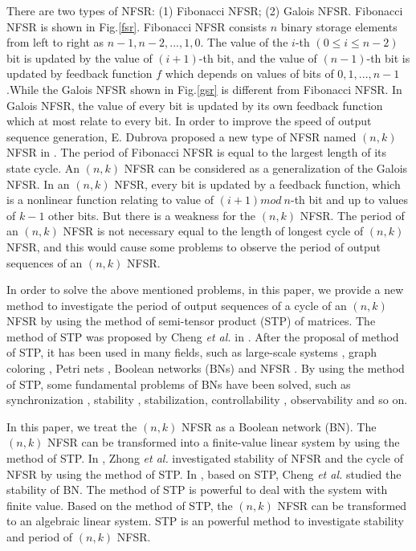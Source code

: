 \documentclass[conference]{IEEEtran}
\begin{document}
There are two types of NFSR: (1) Fibonacci NFSR; (2) Galois NFSR. Fibonacci NFSR is shown in Fig.\ref{fsr}. Fibonacci NFSR consists $n$ binary storage elements from left to right as $n-1,n-2,...,1,0$. The value of the $i$-th $(0\leq i\leq n-2)$ bit is updated by the value of $(i+1)$-th bit, and the value of $(n-1)$-th bit is updated by feedback function $f$ which depends on values of bits of $0,1,...,n-1$.While the Galois NFSR shown in Fig.\ref{gsr} is different from Fibonacci NFSR. In Galois NFSR, the value of every bit is updated by its own feedback function which at most relate to every bit. In order to improve the speed of output sequence generation, E. Dubrova proposed a new type of NFSR named $(n,k)$ NFSR in \cite{Dubrova2008On}. The period of Fibonacci NFSR is equal to the largest length of its state cycle. An $(n,k)$ NFSR can be considered as a generalization of the Galois NFSR. In an $(n,k)$ NFSR, every bit is updated by a feedback function, which is a nonlinear function relating to value of $(i+1)mod~n$-th bit and up to values of $k-1$ other bits. But there is a weakness for the $(n,k)$ NFSR. The period of an $(n,k)$ NFSR is not necessary equal to the length of longest cycle of $(n,k)$ NFSR, and this would cause some problems to observe the period of output sequences of an $(n,k)$ NFSR. 

In order to solve the above mentioned problems, in this paper, we provide a new method to investigate the period of output sequences of a cycle of an $(n,k)$ NFSR by using the method of semi-tensor product (STP) of matrices. The method of STP was proposed by Cheng \textit{et al.} in \cite{Cheng2011Analysis}. After the proposal of method of STP, it has been used in many fields, such as large-scale systems \cite{Zhao2013Aggregation}, graph coloring \cite{Wang2012A}\cite{Zhong2015Finding}, Petri nets \cite{Han2015Calculation}, Boolean networks (BNs) \cite{Guo2015Set}\cite{Fornasini2013On} and NFSR \cite{Zhong2014Stability}\cite{Zhao2014Novel}. By using the method of STP, some fundamental problems of BNs have been solved,
such as synchronization \cite{Zhong2014Synchronization}\cite{Zhang2014Synchronization}, stability \cite{Liu2016Sampled}\cite{Li2014Stability}\cite{Fornasini2013On}, stabilization\cite{Li2016Feedback}\cite{Bof2015Output}, controllability \cite{Lu2016On}\cite{Zhong2016Controllability}\cite{Liu2015Controllability}\cite{Li2016On}, observability \cite{Laschov2013Observability}\cite{Zhang2013Controllability} and so on.

In this paper, we treat the $(n,k)$ NFSR as a Boolean network (BN). The $(n,k)$ NFSR can be transformed into a finite-value linear system by using the method of STP. In \cite{Zhong2014Stability}, Zhong \textit{et al.} investigated stability of NFSR and the cycle of NFSR by using the method of STP. In \cite{Cheng2011Stability}, based on STP, Cheng \textit{et al.} studied the stability of BN. The method of STP is powerful to deal with the system with finite value. Based on the method of STP, the $(n,k)$ NFSR can be transformed to an algebraic linear system. STP is an powerful method to investigate stability and period of $(n,k)$ NFSR.
\end{document}
